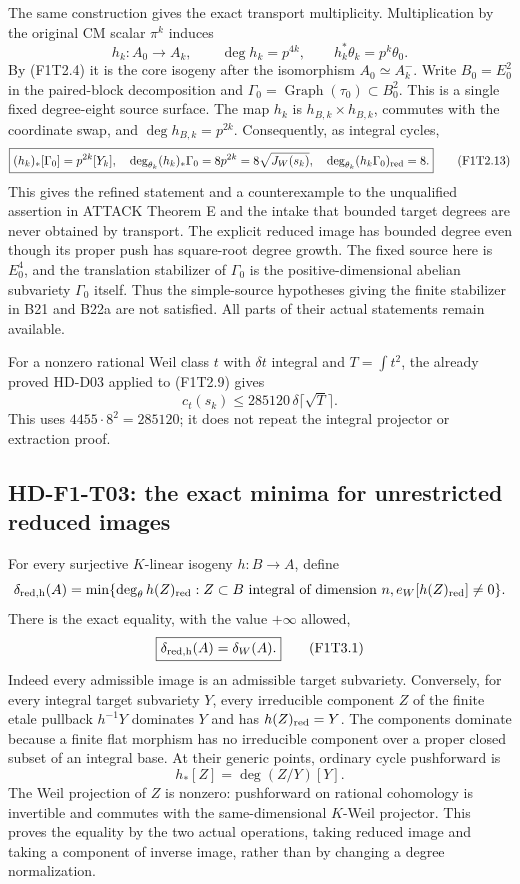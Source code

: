 The same construction gives the exact transport multiplicity.
Multiplication by the original CM scalar $\pi^k$ induces
\[
 h_k:A_0\longrightarrow A_k,\qquad
 \deg h_k=p^{4k},\qquad h_k^*\theta_k=p^k\theta_0.
 \tag{F1T2.12}
\]
By (F1T2.4) it is the core isogeny after the isomorphism
$A_0\simeq A_k^-$. Write $B_0=E_0^2$ in the paired-block
decomposition and $\Gamma_0=\operatorname{Graph}(\tau_0)\subset
B_0^2$. This is a single fixed degree-eight source surface.
The map $h_k$ is $h_{B,k}\times h_{B,k}$, commutes with the
coordinate swap, and $\deg h_{B,k}=p^{2k}$.
Consequently, as integral cycles,
\[
 \boxed{(h_k)_*[\Gamma_0]=p^{2k}[Y_k],\quad
   \deg_{\theta_k}(h_k)_*\Gamma_0=8p^{2k}
                                =8\sqrt{J_W(s_k)},\quad
   \deg_{\theta_k}(h_k\Gamma_0)_{\rm red}=8.}
 \tag{F1T2.13}
\]
This gives the refined statement and a counterexample to the
unqualified assertion in ATTACK Theorem E and the intake that
bounded target degrees are never obtained by transport.
The explicit reduced image has bounded degree even though its
proper push has square-root degree growth. The fixed source here
is $E_0^4$, and the translation stabilizer of $\Gamma_0$ is the
positive-dimensional abelian subvariety $\Gamma_0$ itself. Thus the
simple-source hypotheses giving the finite stabilizer in B21 and
B22a are not satisfied. All parts of their actual statements remain
available.

For a nonzero rational Weil class $t$ with $\delta t$ integral and
$T=\int t^2$, the already proved HD-D03 applied to (F1T2.9) gives
\[
 \boxed{c_t(s_k)\le285120\,\delta\lceil\sqrt T\rceil.}
 \tag{F1T2.14}
\]
This uses $4455\cdot8^2=285120$; it does not repeat the integral
projector or extraction proof.

\subsection{HD-F1-T03: the exact minima for unrestricted reduced images}

For every surjective $K$-linear isogeny $h:B\to A$, define
\[
 \delta_{\rm red,h}(A)=\min\{\deg_\theta h(Z)_{\rm red}:
 Z\subset B\text{ integral of dimension }n,
 e_W[h(Z)_{\rm red}]\ne0\}.
\]
There is the exact equality, with the value $+\infty$ allowed,
\[
 \boxed{\delta_{\rm red,h}(A)=\delta_W(A).}                \tag{F1T3.1}
\]
Indeed every admissible image is an admissible target subvariety.
Conversely, for every integral target subvariety $Y$, every
irreducible component $Z$ of the finite etale pullback $h^{-1}Y$
dominates $Y$ and has $h(Z)_{\rm red}=Y$.
The components dominate because a finite flat morphism has no
irreducible component over a proper closed subset of an integral
base. At their generic points, ordinary cycle pushforward is
\[
 h_*[Z]=\deg(Z/Y)[Y].                                      \tag{F1T3.2}
\]
The Weil projection of $Z$ is nonzero: pushforward on rational
cohomology is invertible and commutes with the same-dimensional
$K$-Weil projector. This proves the equality by the two actual
operations, taking reduced image and taking a component of inverse
image, rather than by changing a degree normalization.

